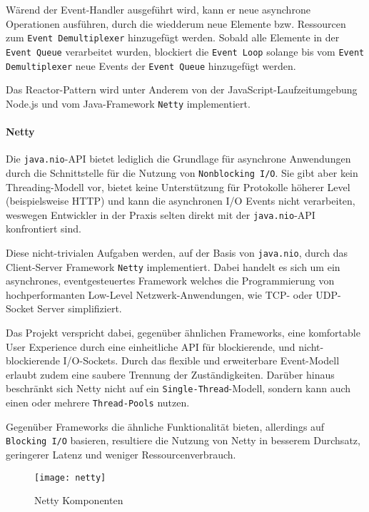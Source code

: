 Wärend der Event-Handler ausgeführt wird, kann er neue asynchrone Operationen ausführen, durch die wiedderum
neue Elemente bzw. Ressourcen zum \verb|Event Demultiplexer| hinzugefügt werden.
Sobald alle Elemente in der \verb|Event Queue| verarbeitet wurden, blockiert die \verb|Event Loop| solange
bis vom \verb|Event Demultiplexer| neue Events der \verb|Event Queue| hinzugefügt werden. \parencite{SchmidtReactorPattern}

Das Reactor-Pattern wird unter Anderem von der JavaScript-Laufzeitumgebung Node.js und vom Java-Framework \verb|Netty| implementiert.

\paragraph{Netty}
Die \verb|java.nio|-API bietet lediglich die Grundlage für asynchrone Anwendungen
durch die Schnittstelle für die Nutzung von \verb|Nonblocking I/O|.
Sie gibt aber kein Threading-Modell vor, bietet keine Unterstützung für Protokolle höherer Level (beispielsweise HTTP) und
kann die asynchronen I/O Events nicht verarbeiten, weswegen Entwickler in der Praxis selten direkt mit der \verb|java.nio|-API
konfrontiert sind.

Diese nicht-trivialen Aufgaben werden, auf der Basis von \verb|java.nio|, durch das Client-Server Framework \verb|Netty| implementiert.
Dabei handelt es sich um ein asynchrones, eventgesteuertes Framework welches
die Programmierung von hochperformanten Low-Level Netzwerk-Anwendungen, wie TCP- oder UDP-Socket Server simplifiziert. \parencite{NettyUserAction}

Das Projekt verspricht dabei, gegenüber ähnlichen Frameworks, eine komfortable User Experience durch eine einheitliche API für
blockierende, und nicht-blockierende I/O-Sockets. Durch das flexible und erweiterbare Event-Modell erlaubt zudem eine saubere Trennung der Zuständigkeiten.
Darüber hinaus beschränkt sich Netty nicht auf ein \verb|Single-Thread|-Modell, sondern kann auch einen oder mehrere \verb|Thread-Pools| nutzen.

Gegenüber Frameworks die ähnliche Funktionalität bieten, allerdings auf \verb|Blocking I/O| basieren, resultiere die Nutzung von Netty
in besserem Durchsatz, geringerer Latenz und weniger Ressourcenverbrauch. \parencite{Netty}

\begin{figure}[ht]
	\centering
	\texttt{[image: netty]}
	\caption{Netty Komponenten \parencite{Netty}}
	\label{fig:netty}
\end{figure}